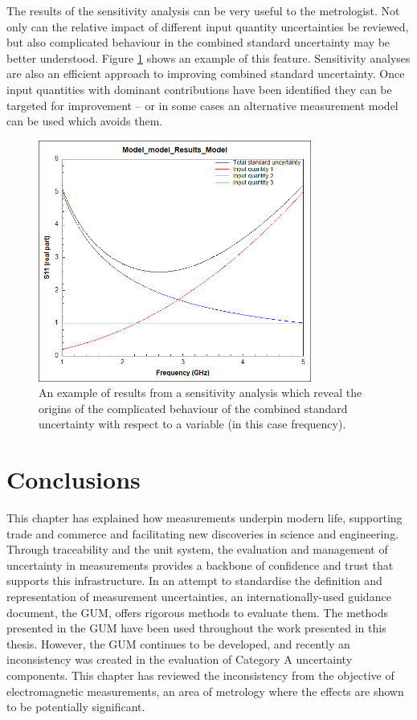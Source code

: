 \documentclass[../thesis/thesis.tex]{subfiles}
\begin{document}
\begin{refsection}
The results of the sensitivity analysis can be very useful to the metrologist. Not only can the relative impact of different input quantity uncertainties be reviewed, but also complicated behaviour in the combined standard uncertainty may be better understood. Figure \ref{ch3_fig_sensitivity} shows an example of this feature. Sensitivity analyses are also an efficient approach to improving combined standard uncertainty. Once input quantities with dominant contributions have been identified they can be targeted for improvement – or in some cases an alternative measurement model can be used which avoids them.

\begin{figure}
	\centering
	\includegraphics[width=0.8\textwidth]{sensitivity}
	\caption{An example of results from a sensitivity analysis which reveal the origins of the complicated behaviour of the combined standard uncertainty with respect to a variable (in this case frequency).}
	\label{ch3_fig_sensitivity}
\end{figure}

\section{Conclusions}

This chapter has explained how measurements underpin modern life, supporting trade and commerce and facilitating new discoveries in science and engineering. Through traceability and the unit system, the evaluation and management of uncertainty in measurements provides a backbone of confidence and trust that supports this infrastructure. In an attempt to standardise the definition and representation of measurement uncertainties, an internationally-used guidance document, the GUM, offers rigorous methods to evaluate them. The methods presented in the GUM have been used throughout the work presented in this thesis. However, the GUM continues to be developed, and recently an inconsistency was created in the evaluation of Category A uncertainty components. This chapter has reviewed the inconsistency from the objective of electromagnetic measurements, an area of metrology where the effects are shown to be potentially significant.


\end{refsection}
\end{document}

